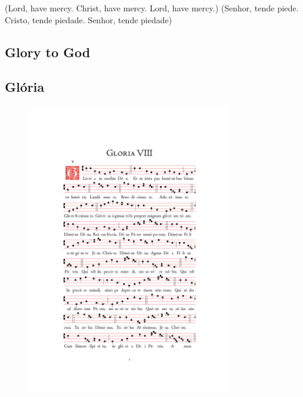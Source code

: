 \documentclass[10pt,a5]{article}
\newcommand \subsect[2] {\subsection*{#1} \switchcolumn \subsection*{#2} \switchcolumn*}
\begin{document}
\begin{paracol}{2}

(Lord, have mercy. Christ, have mercy. Lord, have mercy.)
\switchcolumn
(Senhor, tende piede. Cristo, tende piedade. Senhor, tende piedade)

\switchcolumn*

\subsect{Glory to God}{Gl\'oria}

\end{paracol}

\begin{figure}
	\centering
	\includegraphics[trim = 35mm 45mm 35.5mm 45mm, clip, width = 0.8\textwidth]{scores/Gloria-VIII.pdf}
\end{figure}
\end{document}
